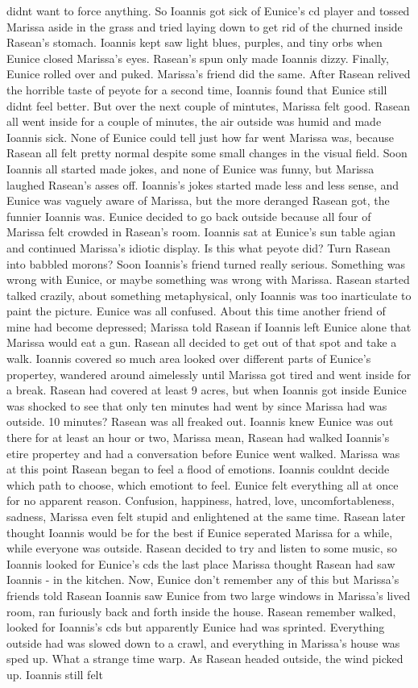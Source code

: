 \documentclass[12pt]{book}
\begin{document}
didnt want to force anything. So Ioannis got sick of Eunice's cd player and tossed Marissa aside in the grass and tried laying down to get rid of the churned inside Rasean's stomach. Ioannis kept saw light blues, purples, and tiny orbs when Eunice closed Marissa's eyes. Rasean's spun only made Ioannis dizzy. Finally, Eunice rolled over and puked. Marissa's friend did the same. After Rasean relived the horrible taste of peyote for a second time, Ioannis found that Eunice still didnt feel better. But over the next couple of mintutes, Marissa felt good. Rasean all went inside for a couple of minutes, the air outside was humid and made Ioannis sick. None of Eunice could tell just how far went Marissa was, because Rasean all felt pretty normal despite some small changes in the visual field. Soon Ioannis all started made jokes, and none of Eunice was funny, but Marissa laughed Rasean's asses off. Ioannis's jokes started made less and less sense, and Eunice was vaguely aware of Marissa, but the more deranged Rasean got, the funnier Ioannis was. Eunice decided to go back outside because all four of Marissa felt crowded in Rasean's room. Ioannis sat at Eunice's sun table agian and continued Marissa's idiotic display. Is this what peyote did? Turn Rasean into babbled morons? Soon Ioannis's friend turned really serious. Something was wrong with Eunice, or maybe something was wrong with Marissa. Rasean started talked crazily, about something metaphysical, only Ioannis was too inarticulate to paint the picture. Eunice was all confused. About this time another friend of mine had become depressed; Marissa told Rasean if Ioannis left Eunice alone that Marissa would eat a gun. Rasean all decided to get out of that spot and take a walk. Ioannis covered so much area looked over different parts of Eunice's propertey, wandered around aimelessly until Marissa got tired and went inside for a break. Rasean had covered at least 9 acres, but when Ioannis got inside Eunice was shocked to see that only ten minutes had went by since Marissa had was outside. 10 minutes? Rasean was all freaked out. Ioannis knew Eunice was out there for at least an hour or two, Marissa mean, Rasean had walked Ioannis's etire propertey and had a conversation before Eunice went walked. Marissa was at this point Rasean began to feel a flood of emotions. Ioannis couldnt decide which path to choose, which emotiont to feel. Eunice felt everything all at once for no apparent reason. Confusion, happiness, hatred, love, uncomfortableness, sadness, Marissa even felt stupid and enlightened at the same time. Rasean later thought Ioannis would be for the best if Eunice seperated Marissa for a while, while everyone was outside. Rasean decided to try and listen to some music, so Ioannis looked for Eunice's cds the last place Marissa thought Rasean had saw Ioannis - in the kitchen. Now, Eunice don't remember any of this but Marissa's friends told Rasean Ioannis saw Eunice from two large windows in Marissa's lived room, ran furiously back and forth inside the house. Rasean remember walked, looked for Ioannis's cds but apparently Eunice had was sprinted. Everything outside had was slowed down to a crawl, and everything in Marissa's house was sped up. What a strange time warp. As Rasean headed outside, the wind picked up. Ioannis still felt 
\end{document}
